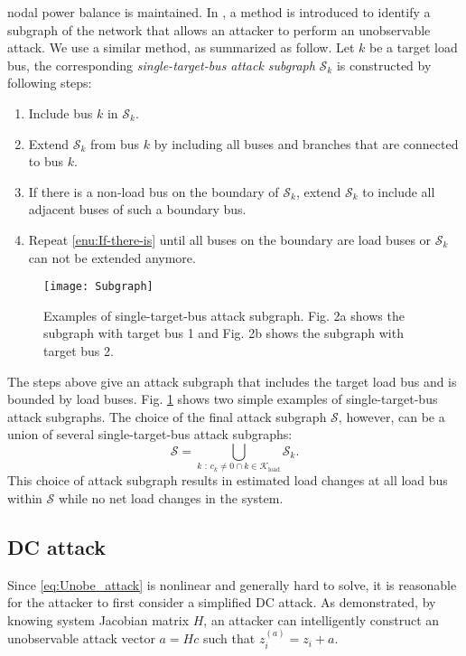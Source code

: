 \documentclass[twocolumn,english,final,journal]{IEEEtran}
\theoremstyle{plain}
\theoremstyle{definition}
\begin{document}
nodal power balance is maintained. In , a method is
introduced to identify a subgraph of the network that allows an attacker
to perform an unobservable attack. We use a similar method, as summarized
as follow. Let $k$ be a target load bus, the corresponding \emph{single-target-bus
attack subgraph} $\mathcal{S}_{k}$ is constructed by following steps:
\begin{enumerate}
\item Include bus $k$ in $\mathcal{S}_{k}$. 
\item Extend $\mathcal{S}_{k}$ from bus $k$ by including all buses and
branches that are connected to bus $k$.
\item \label{enu:If-there-is}If there is a non-load bus on the boundary
of $\mathcal{S}_{k}$, extend $\mathcal{S}_{k}$ to include all adjacent
buses of such a boundary bus.
\item Repeat \eqref{enu:If-there-is} until all buses on the boundary are
load buses or $\mathcal{S}_{k}$ can not be extended anymore.
\end{enumerate}
\begin{figure}
\texttt{[image: Subgraph]}
\caption{Examples of single-target-bus attack subgraph. Fig. 2a shows the subgraph
with target bus 1 and Fig. 2b shows the subgraph with target bus 2.}
\label{fig:Figure 1} 
\end{figure}
The steps above give an attack subgraph that includes the target load
bus and is bounded by load buses. Fig. \ref{fig:Figure 1} shows two
simple examples of single-target-bus attack subgraphs. The choice
of the final attack subgraph $\mathcal{S}$, however, can be a union
of several single-target-bus attack subgraphs:
\begin{equation}
\mathcal{S}=\underset{k\mbox{ : }c_{k}\neq0\cap k\in\mathcal{K}_{\textrm{load}}}{\bigcup}\mathcal{S}_{k}\mbox{.}
\end{equation}
This choice of attack subgraph results in estimated load changes at
all load bus within $\mathcal{S}$ while no net load changes in the
system. 

\subsection{DC attack \label{sub:DC-attack}}

Since \eqref{eq:Unobe_attack} is nonlinear and generally hard to
solve, it is reasonable for the attacker to first consider a simplified
DC attack. As  demonstrated, by knowing system Jacobian
matrix $H$, an attacker can intelligently construct an unobservable
attack vector $a=Hc$ such that $z_{i}^{(a)}=z_{i}+a.$
\end{document}
